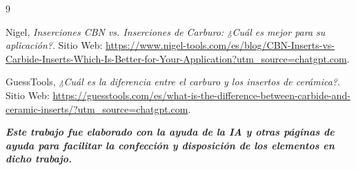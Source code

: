\documentclass[12pt,a4paper]{article}
\begin{document}
\begin{thebibliography}{9}

Nigel, \textit{Inserciones CBN vs. Inserciones de Carburo: ¿Cuál es mejor para su aplicación?}. Sitio Web: \url{https://www.nigel-tools.com/es/blog/CBN-Inserts-vs-Carbide-Inserts-Which-Is-Better-for-Your-Application?utm_source=chatgpt.com}.

GuessTools, \textit{¿Cuál es la diferencia entre el carburo y los insertos de cerámica?}. Sitio Web: \url{https://guesstools.com/es/what-is-the-difference-between-carbide-and-ceramic-inserts/?utm_source=chatgpt.com}.

\end{thebibliography}

\vfill
\textit{\textbf{Este trabajo fue elaborado con la ayuda de la IA y otras páginas de ayuda para facilitar la confección y disposición de los elementos en dicho trabajo.}}
\end{document}
